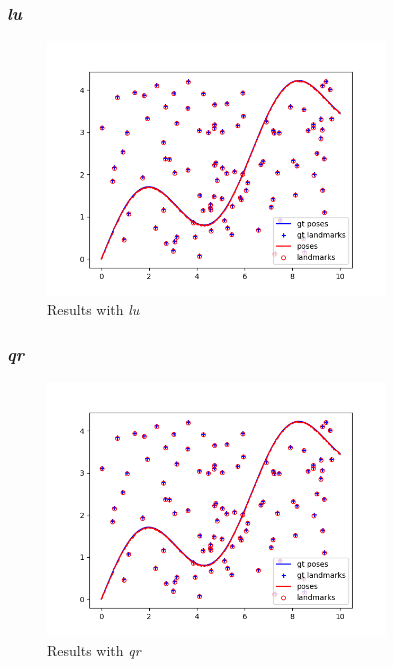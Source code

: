 \documentclass[12pt, a4paper]{article}
\begin{document}
\subsubsection{\textit{lu}}
\begin{figure}[H]
  \centering
  \includegraphics[width=0.8\textwidth]{./results/linear/lu_2d_linear_map.png}
  \caption{Results with \textit{lu}}
\end{figure}
\subsubsection{\textit{qr}}
\begin{figure}[H]
  \centering
  \includegraphics[width=0.8\textwidth]{./results/linear/qr_2d_linear_map.png}
  \caption{Results with \textit{qr}}
\end{figure}
\end{document}
